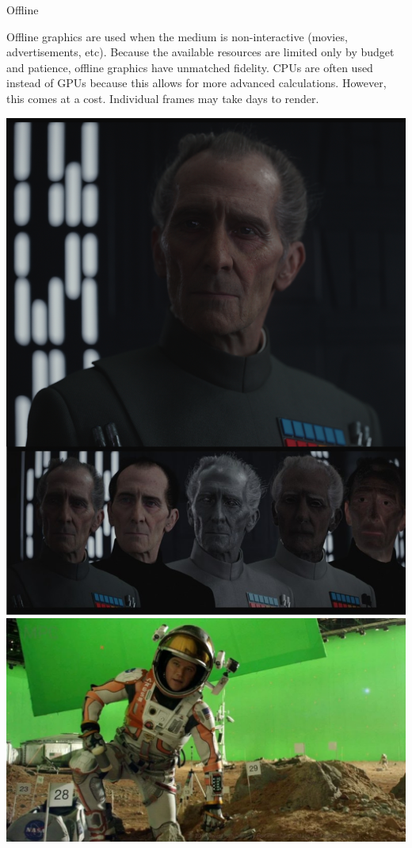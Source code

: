 \documentclass{lug}
\newcommand{\splitslide}[4]{
    \noindent
    \begin{minipage}{#1 \textwidth - #2 }
        #3
    \end{minipage}%
    \hspace{ \dimexpr #2 * 2 \relax }%
    \begin{minipage}{\textwidth - #1 \textwidth - #2 }
        #4
    \end{minipage}
}
\begin{document}
\begin{frame}{Offline}
    \splitslide{0.7}{.7em}{
        \small

        Offline graphics are used when the medium is non-interactive (movies,
        advertisements, etc). Because the available resources are limited only
        by budget and patience, offline graphics have unmatched fidelity. CPUs
        are often used instead of GPUs because this allows for more advanced
        calculations. However, this comes at a cost. Individual frames may
        take days to render.

    }{
        \includegraphics[width=\textwidth]{graphics/tarkin_combo} \\
        \includegraphics[width=\textwidth]{graphics/green_mars}
    }
\end{frame}
\end{document}
